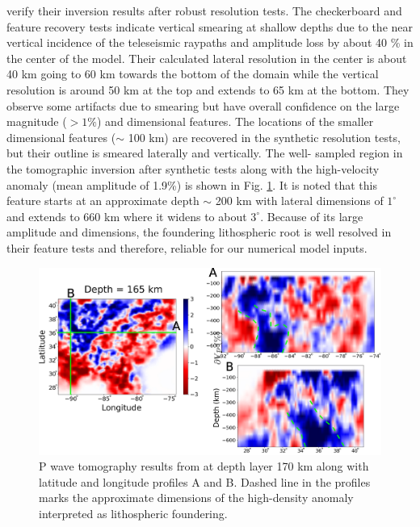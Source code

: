 \documentclass[draft,linenumbers]{agujournal2018}
\begin{document}
    \citet{Biryol_2016} verify their inversion results after robust resolution tests. The checkerboard and feature recovery tests indicate vertical smearing at shallow depths due to the near vertical incidence of the teleseismic raypaths and amplitude loss by about 40 \% in the center of the model. Their calculated lateral resolution in the center is about 40 km going to 60 km towards the bottom of the domain while the vertical resolution  is around 50 km at the top and extends to 65 km at the bottom. They observe some artifacts due to smearing but have overall confidence on the large magnitude ($> 1\%$) and dimensional features. The locations of the smaller dimensional features ($\sim$ 100 km) are recovered in the synthetic resolution tests, but their outline is smeared laterally and vertically. The well- sampled region  in the tomographic inversion after synthetic tests along with the high-velocity anomaly (mean amplitude of 1.9\%) is shown in Fig. \ref{fig_tomo}. It is noted that this feature starts at an approximate depth $\sim$ 200 km with lateral dimensions of $1^\circ$ and extends to 660 km where it widens to about $3^\circ$. Because of its large amplitude and dimensions, the foundering lithospheric root is well resolved in their feature tests and therefore, reliable for our numerical model inputs. 

\begin{figure}[ht]
    \centering
    \includegraphics[width=\linewidth]{figures/figure_tomography.png}
    \caption{P wave tomography results from \citep{Biryol_2016} at depth layer 170 km along with latitude and longitude profiles A and B. Dashed line in the profiles marks the approximate dimensions of the high-density anomaly interpreted as lithospheric foundering. }
    \label{fig_tomo}
 \end{figure}
\end{document}
